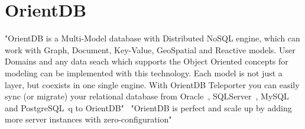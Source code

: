 \section{OrientDB}

"OrientDB is a Multi-Model database with Distributed NoSQL engine, which can work with Graph, 
Document, Key-Value, GeoSpatial and Reactive models. User Domains and any data seach which supports
the Object Oriented concepts for modeling can be implemented with this technology. Each model is 
not just a layer, but coexists in one single engine. With OrientDB Teleporter you can easily sync 
(or migrate) your relational database from Oracle~\cite{??}, SQLServer~\cite{??}, MySQL~\cite{??} and PostgreSQL~\cite{??}q to OrientDB"~\cite{OrientDB}
"OrientDB is perfect and scale up by adding more server instances with 
zero-configuration"~\cite{OrientDB-cloud}
